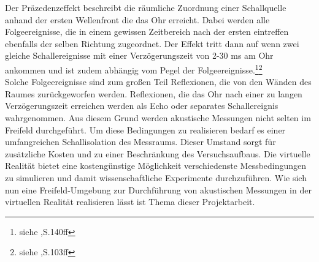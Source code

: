 

Der Präzedenzeffekt beschreibt die räumliche Zuordnung einer Schallquelle anhand der ersten Wellenfront die das Ohr erreicht. Dabei werden alle Folgeereignisse, die in einem gewissen Zeitbereich nach der ersten eintreffen ebenfalls der selben Richtung zugeordnet. Der Effekt tritt dann auf wenn zwei gleiche Schallereignisse mit einer Verzögerungszeit von 2-30 ms am Ohr ankommen und ist zudem abhängig vom Pegel der Folgeereignisse.\footnote{siehe \cite{ency},S.140ff}\footnote{siehe \cite{handbuch},S.103ff}\\
Solche Folgeereignisse sind zum großen Teil Reflexionen, die von den Wänden des Raumes zurückgeworfen werden. Reflexionen, die das Ohr nach einer zu langen Verzögerungszeit erreichen werden als Echo oder separates Schallereignis wahrgenommen. 
Aus diesem Grund werden akustische Messungen nicht selten im Freifeld durchgeführt.
Um diese Bedingungen zu realisieren bedarf es einer umfangreichen Schallisolation des Messraums. Dieser Umstand sorgt für zusätzliche Kosten und zu einer Beschränkung des
Versuchsaufbaus.
Die virtuelle Realität bietet eine kostengünstige Möglichkeit verschiedenste Messbedingungen zu simulieren und damit wissenschaftliche Experimente durchzuführen.
Wie sich nun eine Freifeld-Umgebung zur Durchführung von akustischen Messungen in der virtuellen Realität realisieren lässt ist Thema dieser Projektarbeit. 



